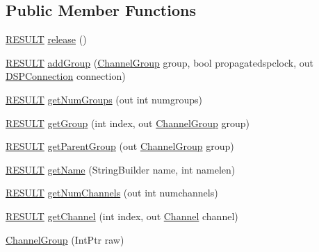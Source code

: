 \subsection*{Public Member Functions}
\begin{DoxyCompactItemize}
\item 
\hyperlink{namespace_f_m_o_d_a305d1176ef3f8c8815861a60407ac33d}{R\+E\+S\+U\+LT} \hyperlink{class_f_m_o_d_1_1_channel_group_af3e707a8f005ad3a94779027bd20bc1a}{release} ()
\item 
\hyperlink{namespace_f_m_o_d_a305d1176ef3f8c8815861a60407ac33d}{R\+E\+S\+U\+LT} \hyperlink{class_f_m_o_d_1_1_channel_group_a4d96176a8c0c2444957941ae55bf0001}{add\+Group} (\hyperlink{class_f_m_o_d_1_1_channel_group}{Channel\+Group} group, bool propagatedspclock, out \hyperlink{class_f_m_o_d_1_1_d_s_p_connection}{D\+S\+P\+Connection} connection)
\item 
\hyperlink{namespace_f_m_o_d_a305d1176ef3f8c8815861a60407ac33d}{R\+E\+S\+U\+LT} \hyperlink{class_f_m_o_d_1_1_channel_group_ae901a3a9af8d41e2b4b2fff0e5a60287}{get\+Num\+Groups} (out int numgroups)
\item 
\hyperlink{namespace_f_m_o_d_a305d1176ef3f8c8815861a60407ac33d}{R\+E\+S\+U\+LT} \hyperlink{class_f_m_o_d_1_1_channel_group_ab2f0df58a7dd8d82ee263c806584ee1f}{get\+Group} (int index, out \hyperlink{class_f_m_o_d_1_1_channel_group}{Channel\+Group} group)
\item 
\hyperlink{namespace_f_m_o_d_a305d1176ef3f8c8815861a60407ac33d}{R\+E\+S\+U\+LT} \hyperlink{class_f_m_o_d_1_1_channel_group_a7440720697ce62ba2d9bfc9eca55ab8a}{get\+Parent\+Group} (out \hyperlink{class_f_m_o_d_1_1_channel_group}{Channel\+Group} group)
\item 
\hyperlink{namespace_f_m_o_d_a305d1176ef3f8c8815861a60407ac33d}{R\+E\+S\+U\+LT} \hyperlink{class_f_m_o_d_1_1_channel_group_a30ba57fae8c8708f90da9d4de9f36336}{get\+Name} (String\+Builder name, int namelen)
\item 
\hyperlink{namespace_f_m_o_d_a305d1176ef3f8c8815861a60407ac33d}{R\+E\+S\+U\+LT} \hyperlink{class_f_m_o_d_1_1_channel_group_a28564a87ec233c5e0ed49869ed5b94c9}{get\+Num\+Channels} (out int numchannels)
\item 
\hyperlink{namespace_f_m_o_d_a305d1176ef3f8c8815861a60407ac33d}{R\+E\+S\+U\+LT} \hyperlink{class_f_m_o_d_1_1_channel_group_a6cca9c6376b7c588821b8e75c3e072cf}{get\+Channel} (int index, out \hyperlink{class_f_m_o_d_1_1_channel}{Channel} channel)
\item 
\hyperlink{class_f_m_o_d_1_1_channel_group_a27ea067b85feb35e8ede85a74e88a52f}{Channel\+Group} (Int\+Ptr raw)
\end{DoxyCompactItemize}
